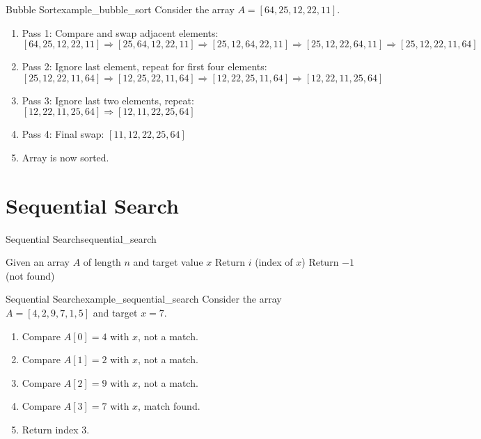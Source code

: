 \begin{exampletcb}
    {Bubble Sort}{example_bubble_sort}
    Consider the array $A = [64, 25, 12, 22, 11]$.

    \begin{enumerate}
        \item Pass 1: Compare and swap adjacent elements:
            \newline $[64, 25, 12, 22, 11] \Rightarrow [25, 64, 12, 22, 11] \Rightarrow [25, 12, 64, 22, 11] \Rightarrow [25, 12, 22, 64, 11] \Rightarrow [25, 12, 22, 11, 64]$
        \item Pass 2: Ignore last element, repeat for first four elements:
            \newline $[25, 12, 22, 11, 64] \Rightarrow [12, 25, 22, 11, 64] \Rightarrow [12, 22, 25, 11, 64] \Rightarrow [12, 22, 11, 25, 64]$
        \item Pass 3: Ignore last two elements, repeat:
            \newline $[12, 22, 11, 25, 64] \Rightarrow [12, 11, 22, 25, 64]$
        \item Pass 4: Final swap:
            \newline $[11, 12, 22, 25, 64]$
        \item Array is now sorted.
    \end{enumerate}
\end{exampletcb}

\section{Sequential Search}
\begin{algorithmtcb}
    {Sequential Search}{sequential_search}
    \begin{algorithmic}
        \State Given an array $A$ of length $n$ and target value $x$
                \State Return $i$ (index of $x$)
            \EndIf
        \EndFor
        \State Return $-1$ (not found)
    \end{algorithmic}
\end{algorithmtcb}

\begin{exampletcb}
    {Sequential Search}{example_sequential_search}
    Consider the array $A = [4, 2, 9, 7, 1, 5]$ and target $x = 7$.

    \begin{enumerate}
        \item Compare $A[0] = 4$ with $x$, not a match.
        \item Compare $A[1] = 2$ with $x$, not a match.
        \item Compare $A[2] = 9$ with $x$, not a match.
        \item Compare $A[3] = 7$ with $x$, match found.
        \item Return index $3$.
    \end{enumerate}
\end{exampletcb}

